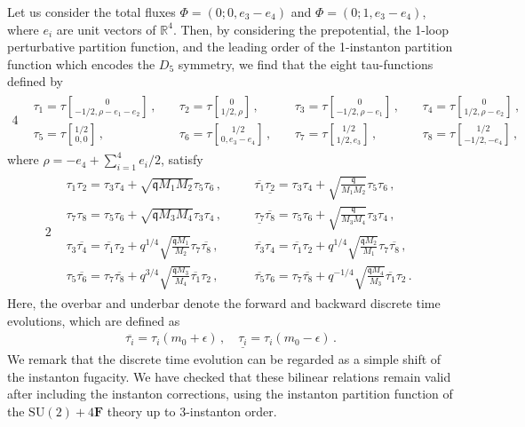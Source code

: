 \documentclass[11pt, a4paper]{article}
\newcommand{\tauftn}[2]{\tau\genfrac[]{0pt}{1}{#1}{#2}}
\theoremstyle{definition}
\begin{document}
Let us consider the total fluxes $ \Phi = (0; 0, e_3-e_4) $ and $ \Phi = (0; 1, e_3-e_4) $, where $ e_i $ are unit vectors of $ \mathbb{R}^4 $. Then, by considering the prepotential, the 1-loop perturbative partition function, and the leading order of the 1-instanton partition function which encodes the $ D_5 $ symmetry, we find that the eight tau-functions defined by
\begin{alignat}{4}
    \begin{aligned}
        &\tau_1 = \tauftn{0}{-1/2, \rho-e_1-e_2} \, , \
        &&\tau_2 = \tauftn{0}{1/2, \rho} \, , \
        &&\tau_3 = \tauftn{0}{-1/2, \rho-e_1} \, , \
        &&\tau_4 = \tauftn{0}{1/2, \rho-e_2} \, , \\
        &\tau_5 = \tauftn{1/2}{0,0} \, , \
        &&\tau_6 = \tauftn{1/2}{0,e_3-e_4} \, , \
        &&\tau_7 = \tauftn{1/2}{1/2,e_3} \, , \
        &&\tau_8 = \tauftn{1/2}{-1/2,-e_4} \, ,
    \end{aligned}
\end{alignat}
where $ \rho = -e_4 + \sum_{i=1}^4 e_i/2 $, satisfy
\begin{alignat}{2}
    \begin{aligned}\label{eq:4F-bilinear}
        &\tau_1 \tau_2 = \tau_3 \tau_4 + \sqrt{\mathfrak{q}M_1M_2} \tau_5 \tau_6 \, , \quad
        &&\overline{\tau_1} \underline{\tau_2} = \tau_3 \tau_4 + \sqrt{\frac{\mathfrak{q}}{M_1M_2}} \tau_5 \tau_6 \, , \\
        &\tau_7 \tau_8 = \tau_5 \tau_6 + \sqrt{\mathfrak{q}M_3M_4} \tau_3 \tau_4 \, , \quad
        &&\underline{\tau_7} \overline{\tau_8} = \tau_5 \tau_6 + \sqrt{\frac{\mathfrak{q}}{M_3M_4}} \tau_3 \tau_4 \, , \\
        & \tau_3 \overline{\tau_4} = \overline{\tau_1} \tau_2 + q^{1/4} \sqrt{\frac{\mathfrak{q} M_1}{M_2}} \tau_7 \overline{\tau_8} \, , \quad
        && \overline{\tau_3} \tau_4 = \overline{\tau_1} \tau_2 + q^{1/4} \sqrt{\frac{\mathfrak{q}M_2}{M_1}} \tau_7 \overline{\tau_8} \, , \\
        & \tau_5 \overline{\tau_6} = \tau_7 \overline{\tau_8} + q^{3/4} \sqrt{\frac{\mathfrak{q}M_3}{M_4}} \overline{\tau_1} \tau_2 \, , \quad
        && \overline{\tau_5} \tau_6 = \tau_7 \overline{\tau_8} + q^{-1/4} \sqrt{\frac{\mathfrak{q}M_4}{M_3}} \overline{\tau_1}\tau_2 \, .
    \end{aligned}
\end{alignat}
Here, the overbar and underbar denote the forward and backward discrete time evolutions, which are defined as
\begin{align}
    \overline{\tau_i} = \tau_i(m_0+\epsilon) \, , \quad
    \underline{\tau_i} = \tau_i(m_0-\epsilon) \, .
\end{align}
We remark that the discrete time evolution can be regarded as a simple shift of the instanton fugacity. We have checked that these bilinear relations remain valid after including the instanton corrections, using the instanton partition function of the $ \mathrm{SU}(2)+4\mathbf{F} $ theory up to 3-instanton order. 
\end{document}
